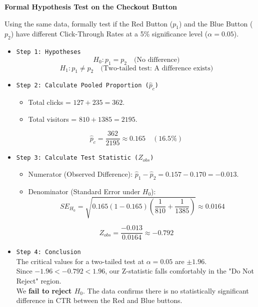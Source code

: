 \vspace{0.2cm}
\begin{example}{\textbf{Formal Hypothesis Test on the Checkout Button}}

Using the same data, formally test if the Red Button ($p_1$) and the Blue Button ($p_2$) have different Click-Through Rates at a 5\% significance level ($\alpha = 0.05$).

\begin{itemize}
    \item \texttt{Step 1: Hypotheses} 
    $$ H_0: p_1 = p_2 \quad \text{(No difference)} $$
    $$ H_1: p_1 \neq p_2 \quad \text{(Two-tailed test: A difference exists)} $$

    \item \texttt{Step 2: Calculate Pooled Proportion ($\hat{p}_c$)} 
    \begin{itemize}
        \item Total clicks = $127 + 235 = 362$.
        \item Total visitors = $810 + 1385 = 2195$.
    \end{itemize}
    $$ \hat{p}_c = \frac{362}{2195} \approx 0.165 \quad (16.5\%) $$
    
    \item \texttt{Step 3: Calculate Test Statistic ($Z_{obs}$)} 
    \begin{itemize}
        \item Numerator (Observed Difference): $\hat{p}_1 - \hat{p}_2 = 0.157 - 0.170 = -0.013$.
        \item Denominator (Standard Error under $H_0$):
        $$ SE_{H_0} = \sqrt{0.165(1-0.165)\left(\frac{1}{810} + \frac{1}{1385}\right)} \approx 0.0164 $$
    \end{itemize}
    $$ Z_{obs} = \frac{-0.013}{0.0164} \approx -0.792 $$
    
    \item \texttt{Step 4: Conclusion} \\
    The critical values for a two-tailed test at $\alpha=0.05$ are $\pm 1.96$. \\
    Since $-1.96 < -0.792 < 1.96$, our Z-statistic falls comfortably in the "Do Not Reject" region. \\
    We \textbf{fail to reject $H_0$}. The data confirms there is no statistically significant difference in CTR between the Red and Blue buttons.
\end{itemize}
\end{example}


